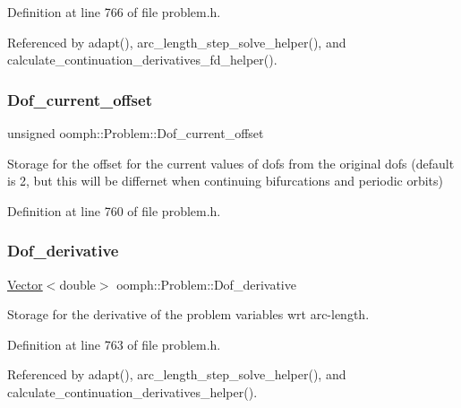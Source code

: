 Definition at line 766 of file problem.\+h.



Referenced by adapt(), arc\+\_\+length\+\_\+step\+\_\+solve\+\_\+helper(), and calculate\+\_\+continuation\+\_\+derivatives\+\_\+fd\+\_\+helper().

\mbox{\label{classoomph_1_1Problem_a57825be8c76db9e23e6a9aa0d73973b2}} 
\subsubsection{\texorpdfstring{Dof\+\_\+current\+\_\+offset}{Dof\_current\_offset}}
{\footnotesize\ttfamily unsigned oomph\+::\+Problem\+::\+Dof\+\_\+current\+\_\+offset\hspace{0.3cm}{\ttfamily [protected]}}

Storage for the offset for the current values of dofs from the original dofs (default is 2, but this will be differnet when continuing bifurcations and periodic orbits) 

Definition at line 760 of file problem.\+h.

\mbox{\label{classoomph_1_1Problem_a1861321b2d129707935bf1191238daca}} 
\subsubsection{\texorpdfstring{Dof\+\_\+derivative}{Dof\_derivative}}
{\footnotesize\ttfamily \hyperlink{classoomph_1_1Vector}{Vector}$<$double$>$ oomph\+::\+Problem\+::\+Dof\+\_\+derivative\hspace{0.3cm}{\ttfamily [protected]}}



Storage for the derivative of the problem variables wrt arc-\/length. 



Definition at line 763 of file problem.\+h.



Referenced by adapt(), arc\+\_\+length\+\_\+step\+\_\+solve\+\_\+helper(), and calculate\+\_\+continuation\+\_\+derivatives\+\_\+helper().

